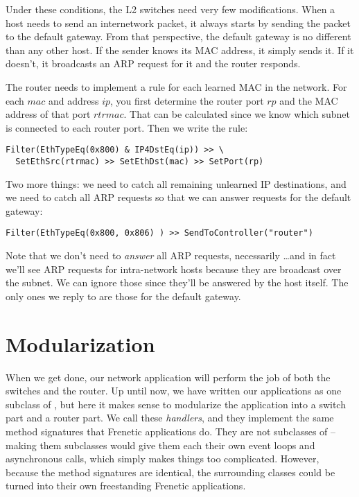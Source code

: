 Under these conditions, the L2 switches need very few modifications.  When a host needs to send an 
internetwork packet, it always starts by sending the packet to the default gateway.  From that 
perspective, the default gateway is no different than any other host.  If the sender knows 
its MAC address, it simply sends it.  If it doesn't, it broadcasts an ARP request for it and the
router responds.  

The router needs to implement a rule for each learned MAC in the network.  For each
$mac$ and address $ip$, you first determine the router port $rp$ and the MAC address of that
port $rtrmac$.  That can be calculated since
we know which subnet is connected to each router port.  Then we write the rule:

\begin{verbatim}
Filter(EthTypeEq(0x800) & IP4DstEq(ip)) >> \
  SetEthSrc(rtrmac) >> SetEthDst(mac) >> SetPort(rp) 
\end{verbatim}

Two more things: we need to catch all remaining unlearned IP destinations, and 
we need to catch all ARP requests so that we can answer requests for the default gateway:

\begin{verbatim}
Filter(EthTypeEq(0x800, 0x806) ) >> SendToController("router") 
\end{verbatim}

Note that we don't need to \emph{answer} all ARP requests, necessarily \ldots and in fact we'll see
ARP requests for intra-network hosts because they are broadcast over the subnet.  We can ignore those
since they'll be answered by the host itself.  The only ones we reply to are those for the default 
gateway.  

\section{Modularization}

When we get done, our network application will perform the job of both the switches and the router.  
Up until now, we have written our applications as one subclass of \python{Frenetic.App}, but here
it makes sense to modularize the application into a switch part and a router part.  We call these
\emph{handlers}, and they implement the same method signatures that Frenetic applications do.  
They are not subclasses of \python{Frenetic.App} -- making them subclasses would give them each 
their own event loops and asynchronous calls, which simply makes things too complicated.   However, 
because the method signatures are identical, the surrounding classes
could be turned into their own freestanding Frenetic applications.

